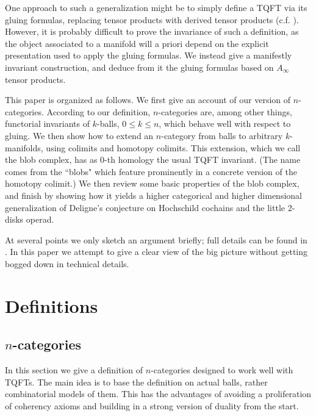 \documentclass{pnastwo}
\begin{document}
\begin{article}
One approach to such a generalization might be to simply define a
TQFT via its gluing formulas, replacing tensor products with
derived tensor products (c.f. \cite{1011.1958}).
However, it is probably difficult to prove
the invariance of such a definition, as the object associated to a manifold
will a priori depend on the explicit presentation used to apply the gluing formulas.
We instead give a manifestly invariant construction, and
deduce from it the gluing formulas based on $A_\infty$ tensor products.

This paper is organized as follows.
We first give an account of our version of $n$-categories.
According to our definition, $n$-categories are, among other things,
functorial invariants of $k$-balls, $0\le k \le n$, which behave well with respect to gluing.
We then show how to extend an $n$-category from balls to arbitrary $k$-manifolds,
using colimits and homotopy colimits.
This extension, which we call the blob complex, has as $0$-th homology the usual TQFT invariant.
(The name comes from the ``blobs" which feature prominently
in a concrete version of the homotopy colimit.)
We then review some basic properties of the blob complex, and finish by showing how it
yields a higher categorical and higher dimensional generalization of Deligne's
conjecture on Hochschild cochains and the little 2-disks operad.

At several points we only sketch an argument briefly; full details can be found in \cite{1009.5025}. 
In this paper we attempt to give a clear view of the big picture without getting 
bogged down in technical details.


\section{Definitions}
\subsection{$n$-categories} \mbox{}

In this section we give a definition of $n$-categories designed to work well with TQFTs.
The main idea is to base the definition on actual balls, rather combinatorial models of them.
This has the advantages of avoiding a proliferation of coherency axioms and building in a strong
version of duality from the start.



\end{article}
\end{document}
